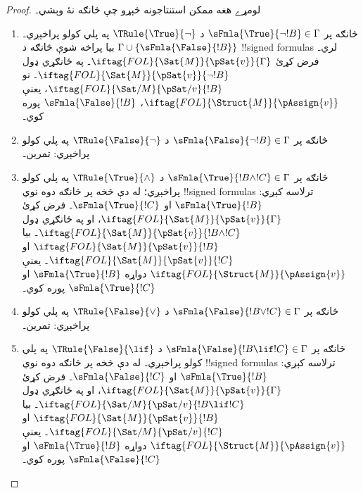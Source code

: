 \documentclass[../../../include/open-logic-section]{subfiles}
\begin{document}
\begin{proof}
لومړے هغه ممکن استنتاجونه څېړو چې څانګه نۀ وېشي۔
\begin{enumerate}
\item څانګه پر $\sFmla{\True}{\lnot !B} \in \Gamma$ د
  $\TRule{\True}{\lnot}$ په پلي کولو پراخېږي۔ بيا پراخه شوې څانګه
  د $\Gamma \cup \{\sFmla{\False}{!B}\}$ !!{signed formula}s لري۔
  فرض کړئ $\iftag{FOL}{\Sat{M}}{\pSat{v}}{\Gamma}$۔ په ځانګړي ډول
  $\iftag{FOL}{\Sat{M}}{\pSat{v}}{\lnot !B}$۔ نو
  $\iftag{FOL}{\Sat/{M}}{\pSat/{v}}{!B}$، يعنې
  $\iftag{FOL}{\Struct{M}}{\pAssign{v}}$،
  $\sFmla{\False}{!B}$ پوره کوي۔
\item څانګه پر $\sFmla{\False}{\lnot !B} \in \Gamma$ د
  $\TRule{\False}{\lnot}$ په پلي کولو پراخېږي: تمرين۔
\item څانګه پر $\sFmla{\True}{!B \land !C} \in \Gamma$ د
  $\TRule{\True}{\land}$ په پلي کولو پراخېږي؛ له دې څخه پر څانګه
  دوه نوي !!{signed formula}s ترلاسه کېږي: $\sFmla{\True}{!B}$ او
  $\sFmla{\True}{!C}$۔ فرض کړئ
  $\iftag{FOL}{\Sat{M}}{\pSat{v}}{\Gamma}$، او په ځانګړي ډول
  $\iftag{FOL}{\Sat{M}}{\pSat{v}}{!B \land !C}$۔ بيا
  $\iftag{FOL}{\Sat{M}}{\pSat{v}}{!B}$ او
  $\iftag{FOL}{\Sat{M}}{\pSat{v}}{!C}$۔ يعنې
  $\iftag{FOL}{\Struct{M}}{\pAssign{v}}$ دواړه
  $\sFmla{\True}{!B}$ او $\sFmla{\True}{!C}$ پوره کوي۔
\item څانګه پر $\sFmla{\False}{!B \lor !C} \in \Gamma$ د
  $\TRule{\False}{\lor}$ په پلي کولو پراخېږي: تمرين۔
\item څانګه پر $\sFmla{\False}{!B \lif !C} \in \Gamma$ د
  $\TRule{\False}{\lif}$ په پلي کولو پراخېږي۔ له دې څخه پر څانګه
  دوه نوي !!{signed formula}s ترلاسه کېږي: $\sFmla{\True}{!B}$ او
  $\sFmla{\False}{!C}$۔ فرض کړئ
  $\iftag{FOL}{\Sat{M}}{\pSat{v}}{\Gamma}$، او په ځانګړي ډول
  $\iftag{FOL}{\Sat/{M}}{\pSat/{v}}{!B \lif !C}$۔ بيا
  $\iftag{FOL}{\Sat{M}}{\pSat{v}}{!B}$ او
  $\iftag{FOL}{\Sat/{M}}{\pSat/{v}}{!C}$۔ يعنې
  $\iftag{FOL}{\Struct{M}}{\pAssign{v}}$ دواړه
  $\sFmla{\True}{!B}$ او $\sFmla{\False}{!C}$ پوره کوي۔

\end{enumerate}
\end{proof}
\end{document}

